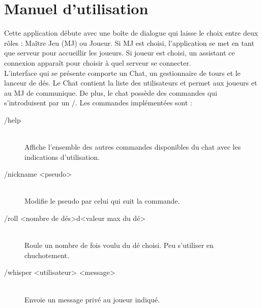\section{Manuel d'utilisation}

Cette application débute avec une boîte de dialogue qui laisse le choix entre deux rôles : Maître Jeu (MJ) ou Joueur. Si MJ est choisi, l'application se met en tant que serveur pour accueillir les joueurs. Si joueur est choisi, un assistant ce connexion apparaît pour choisir à quel serveur se connecter. \\

L'interface qui se présente comporte un Chat, un gestionnaire de tours et le lanceur de dés. Le Chat contient la liste des utilisateurs et permet aux joueurs et au MJ de communique. De plus, le chat possède des commandes qui s'introduisent par un /. Les commandes implémentées sont :

\begin{description}
	\item[/help] \hfill \\
		Affiche l'ensemble des autres commandes disponibles du chat avec les indications d'utilisation.
	\item[/nickname <pseudo>] \hfill \\
		Modifie le pseudo par celui qui suit la commande.
	\item[/roll <nombre de dés>d<valeur max du dé>] \hfill \\
		Roule un nombre de fois voulu du dé choisi. Peu s'utiliser en chuchotement.
	\item[/whisper <utilisateur> <message>] \hfill \\
		Envoie un message privé au joueur indiqué.
\end{description}

